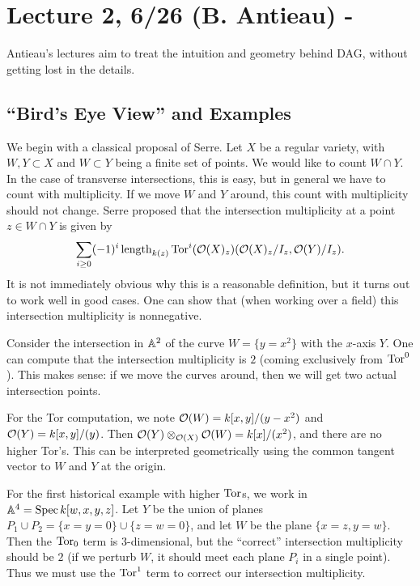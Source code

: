 \documentclass{amsart}
\begin{document}
\section{Lecture 2, 6/26 (B. Antieau) - }

Antieau's lectures aim to treat the intuition and geometry behind DAG, without getting lost in the details.

\subsection{``Bird's Eye View'' and Examples}

We begin with a classical proposal of Serre.
Let $X$ be a regular variety, with $W, Y \subset X$ and $W \subset Y$ being a finite set of points.
We would like to count $W \cap Y$.
In the case of transverse intersections, this is easy, but in general we have to count with multiplicity.
If we move $W$ and $Y$ around, this count with multiplicity should not change.
Serre proposed that the intersection multiplicity at a point $z \in W \cap Y$ is given by
\[
\sum_{i \geq 0} (-1)^i \length_{k(z)} \Tor^i(\Oc(X)_z)(\Oc(X)_z / I_z, \Oc(Y) / I_z).
\]
It is not immediately obvious why this is a reasonable definition, but it turns out to work well in good cases.
One can show that (when working over a field) this intersection multiplicity is nonnegative.

\begin{ex}
Consider the intersection in $\AA^2$ of the curve $W = \{ y = x^2 \}$ with the $x$-axis $Y$.
One can compute that the intersection multiplicity is $2$ (coming exclusively from $\Tor^0$).
This makes sense: if we move the curves around, then we will get two actual intersection points.

For the Tor computation, we note $\Oc(W) = k[x, y] / (y - x^2)$ and $\Oc(Y) = k[x, y] / (y)$.
Then $\Oc(Y) \otimes_{\Oc(X)} \Oc(W) = k[x] / (x^2)$, and there are no higher Tor's.
This can be interpreted geometrically using the common tangent vector to $W$ and $Y$ at the origin.
\end{ex}

\begin{ex}
For the first historical example with higher $\Tor$s, we work in $\AA^4 = \Spec k[w, x, y, z]$.
Let $Y$ be the union of planes $P_1 \cup P_2 = \{ x = y = 0 \} \cup \{ z = w = 0 \}$, and let $W$ be the plane $\{ x = z, y = w\}$.
Then the $\Tor_0$ term is $3$-dimensional, but the ``correct'' intersection multiplicity should be $2$ (if we perturb $W$, it should meet each plane $P_i$ in a single point).
Thus we must use the $\Tor^1$ term to correct our intersection multiplicity.
\end{ex}
\end{document}
